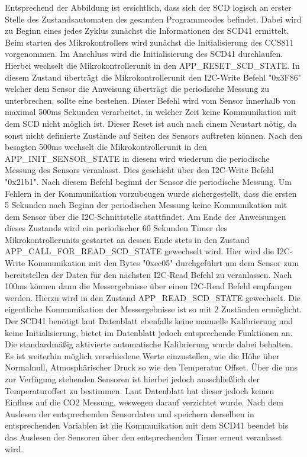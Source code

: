 \documentclass[]{article}
\begin{document}
		Entsprechend der Abbildung ist ersichtlich, dass sich der SCD logisch an erster Stelle des Zustandsautomaten des gesamten Programmcodes befindet. Dabei wird zu Beginn eines jedes Zyklus zunächst die Informationen des SCD41 ermittelt. Beim starten des Mikrokontrollers wird zunächst die Initialisierung des CCS811 vorgenommen. Im Anschluss wird die Initialisierung des SCD41 durchlaufen. Hierbei wechselt die Mikrokontrollerunit in den APP\_RESET\_SCD\_STATE. In diesem Zustand überträgt die Mikrokontrollerunit den I2C-Write Befehl "0x3F86" welcher dem Sensor die Anweisung überträgt die periodische Messung zu unterbrechen, sollte eine bestehen. Dieser Befehl wird vom Sensor innerhalb von maximal 500ms Sekunden verarbeitet, in welcher Zeit keine Kommunikation mit dem SCD nicht möglich ist. Dieser Reset ist auch nach einem Neustart nötig, da sonst nicht definierte Zustände auf Seiten des Sensors auftreten können. Nach den besagten 500ms wechselt die Mikrokontrollerunit in den APP\_INIT\_SENSOR\_STATE in diesem wird wiederum die periodische Messung des Sensors veranlasst. Dies geschieht über den I2C-Write Befehl "0x21b1". Nach diesem Befehl beginnt der Sensor die periodische Messung. Um Fehlern in der Kommunikation vorzubeugen wurde sichergestellt, dass die ersten 5 Sekunden nach Beginn der periodischen Messung keine Kommunikation mit dem Sensor über die I2C-Schnittstelle stattfindet. Am Ende der Anweisungen dieses Zustands wird ein periodischer 60 Sekunden Timer des Mikrokontrollerunits gestartet an dessen Ende stets in den Zustand APP\_CALL\_FOR\_READ\_SCD\_STATE gewechselt wird. Hier wird die I2C-Write Kommunikation mit den Bytes "0xec05" durchgeführt um dem Sensor zum bereitstellen der Daten für den nächsten I2C-Read Befehl zu veranlassen. Nach 100ms können dann die Messergebnisse über einen I2C-Read Befehl empfangen werden. Hierzu wird in den Zustand APP\_READ\_SCD\_STATE gewechselt. Die eigentliche Kommunikation der Messergebnisse ist so mit 2 Zuständen ermöglicht. Der SCD41 benötigt laut Datenblatt ebenfalls keine manuelle Kalibrierung und keine Initialisierung, bietet im Datenblatt jedoch entsprechende Funktionen an. Die standardmäßig aktivierte automatische Kalibrierung wurde dabei behalten. Es ist weiterhin möglich verschiedene Werte einzustellen, wie die Höhe über Normalnull, Atmosphärischer Druck so wie den Temperatur Offset. Über die uns zur Verfügung stehenden Sensoren ist hierbei jedoch ausschließlich der Temperaturoffset zu bestimmen. Laut Datenblatt hat dieser jedoch keinen Einfluss auf die CO2 Messung, weswegen darauf verzichtet wurde. Nach dem Auslesen der entsprechenden Sensordaten und speichern derselben in entsprechenden Variablen ist die Kommunikation mit dem SCD41 beendet bis das Auslesen der Sensoren über den entsprechenden Timer erneut veranlasst wird.
		
\end{document}
